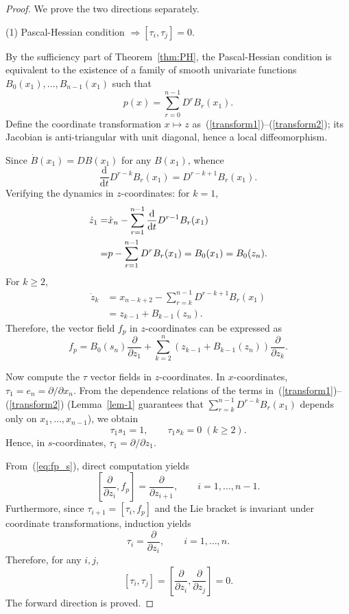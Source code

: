 \documentclass[10pt,a4paper]{amsart}
\begin{document}
\begin{proof}
	We prove the two directions separately.
	
	\noindent (1) Pascal-Hessian condition $\Rightarrow [\tau_i,\tau_j]=0$.

	By the sufficiency part of Theorem~\ref{thm:PH}, the Pascal-Hessian condition is equivalent to the existence of a family of smooth univariate functions $B_0(x_1),\ldots,B_{n-1}(x_1)$ such that
	\begin{equation}\label{eq:p_sum}
		p(x)=\sum_{r=0}^{n-1}D^rB_r(x_1).
	\end{equation}
	Define the coordinate transformation $x\mapsto z$ as~(\ref{transform1})--(\ref{transform2}); its Jacobian is anti-triangular with unit diagonal, hence a local diffeomorphism.

	Since $\dot{B}(x_1)=DB(x_1)$ for any $B(x_1)$, whence
	\[
	\frac{\mathrm{d}}{\mathrm{d}t}D^{r-k}B_r(x_1)=D^{r-k+1}B_r(x_1).
	\]
	Verifying the dynamics in $z$-coordinates: for $k=1$,
	\begin{align}
		\dot{z}_1=&\dot{x}_n-\sum_{r=1}^{n-1}\frac{\mathrm{d}}{\mathrm{d}t}D^{r-1}B_r(x_1)\notag\\
		=&p-\sum_{r=1}^{n-1}D^rB_r(x_1)=B_0(x_1)=B_0(z_n).
	\end{align}
	For $k\geq2$,
	\[
	\begin{aligned}
		\dot{z}_k&=x_{n-k+2}-\sum_{r=k}^{n-1}D^{r-k+1}B_r(x_1)\\
		&=z_{k-1}+B_{k-1}(z_n).
	\end{aligned}
	\]
	Therefore, the vector field $f_p$ in $z$-coordinates can be expressed as
	\begin{equation}\label{eq:fp_s}
		f_p=B_0(s_n)\frac{\partial}{\partial z_1}+\sum_{k=2}^{n}\left(z_{k-1}+B_{k-1}(z_n)\right)\frac{\partial}{\partial z_k}.
	\end{equation}

	Now compute the $\tau$ vector fields in $z$-coordinates. In $x$-coordinates, $\tau_1=e_n=\partial/\partial x_n$. From the dependence relations of the terms in~(\ref{transform1})--(\ref{transform2}) (Lemma~\ref{lem-1} guarantees that $\sum_{r=k}^{n-1}D^{r-k}B_r(x_1)$ depends only on $x_1,\ldots,x_{n-1}$), we obtain
	\[
	\tau_1s_1=1,\qquad \tau_1s_k=0\;(k\geq2).
	\]
	Hence, in $s$-coordinates, $\tau_1=\partial/\partial z_1$.

	From~(\ref{eq:fp_s}), direct computation yields
	\[
	\left[\frac{\partial}{\partial z_i},f_p\right]=\frac{\partial}{\partial z_{i+1}},\qquad i=1,\ldots,n-1.
	\]
	Furthermore, since $\tau_{i+1}=[\tau_i,f_p]$ and the Lie bracket is invariant under coordinate transformations, induction yields
	\[
	\tau_i=\frac{\partial}{\partial z_i},\qquad i=1,\ldots,n.
	\]
	Therefore, for any $i,j$,
	\[
	[\tau_i,\tau_j]=\left[\frac{\partial}{\partial z_i},\frac{\partial}{\partial z_j}\right]=0.
	\]
	The forward direction is proved.


\end{proof}
\end{document}
